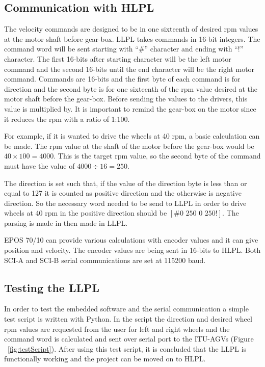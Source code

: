 	\subsection{Communication with HLPL}
	\label{subsec:comm with hlpl}
	The velocity commands are designed to be in one sixteenth of desired rpm values at the motor shaft before gear-box. LLPL takes commands in 16-bit integers. The command word will be sent starting with “\#” character and ending with “!” character. The first 16-bits after starting character will be the left motor command and the second 16-bits until the end character will be the right motor command. Commands are 16-bits and the first byte of each command is for direction and the second byte is for one sixteenth of the rpm value desired at the motor shaft before the gear-box. Before sending the values to the drivers, this value is multiplied by. It is important to remind the gear-box on the motor since it reduces the rpm with a ratio of 1:100. 
	\par
	For example, if it is wanted to drive the wheels at 40 rpm, a basic calculation can be made. The rpm value at the shaft of the motor before the gear-box would be $40\times100=4000$. This is the target rpm value, so the second byte of the command must have the value of $4000\div16=250$. 
	\par
	The direction is set such that, if the value of the direction byte is less than or equal to 127 it is counted as positive direction and the otherwise is negative direction. So the necessary word needed to be send to LLPL in order to drive wheels at 40 rpm in the positive direction should be 
	$[\#\text{0 250 0 250}!]$. The parsing is made in then made in LLPL. 
	\par
	EPOS 70/10 can provide various calculations with encoder values and it can give position and velocity. The encoder values are being sent in 16-bits to HLPL. Both SCI-A and SCI-B serial communications are set at 115200 baud.
		
	\subsection{Testing the LLPL}
	\label{subsec:testing llpl}
	In order to test the embedded software and the serial communication a simple test script is written with Python. In the script the direction and desired wheel rpm values are requested from the user for left and right wheels and the command word is calculated and sent over serial port to the ITU-AGVs (Figure ~\ref{fig:testScript}). After using this test script, it is concluded that the LLPL is functionally working and the project can be moved on to HLPL.
	
